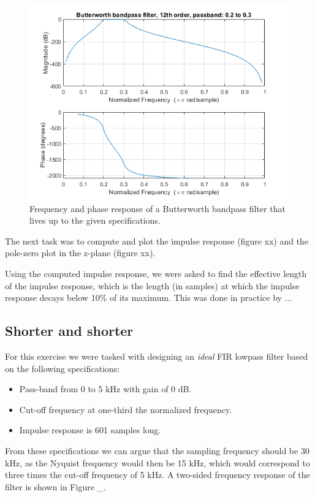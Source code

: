 \documentclass[journal]{IEEEtran}
\begin{document}
\begin{figure} [H]
    \centering
    \includegraphics[width=\linewidth]{assignment_02/plots/butterbandfreq.png}
    \caption{Frequency and phase response of a Butterworth bandpass filter that lives up to the given specifications.}
    \label{fig:butterband}
\end{figure}

The next task was to compute and plot the impulse response (figure xx) and the pole-zero plot in the z-plane (figure xx). 

Using the computed impulse response, we were asked to find the effective length of the impulse response, which is the length (in samples) at which the impulse response decays below 10\% of its maximum. This was done in practice by ...


\subsection{Shorter and shorter}
For this exercise we were tasked with designing an \textit{ideal} FIR lowpass filter based on the following specifications: 
\begin{itemize}
    \item Pass-band from 0 to 5 kHz with gain of 0 dB. 
    \item Cut-off frequency at one-third the normalized frequency. 
    \item Impulse response is 601 samples long. 
\end{itemize}
From these specifications we can argue that the sampling frequency should be 30 kHz, as the Nyquist frequency would then be 15 kHz, which would correspond to three times the cut-off frequency of 5 kHz. A two-sided frequency response of the filter is shown in Figure \_. 
\end{document}

